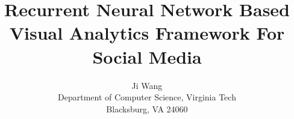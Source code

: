 \documentclass[letterpaper]{article}
\begin{document}
%
\title{Recurrent Neural Network Based Visual Analytics Framework For Social Media}
\author{Ji Wang\\
Department of Computer Science, Virginia Tech\\
Blacksburg, VA 24060\\
}
\maketitle
\begin{abstract}
\begin{quote}



\end{quote}
\end{abstract}








\end{document}
